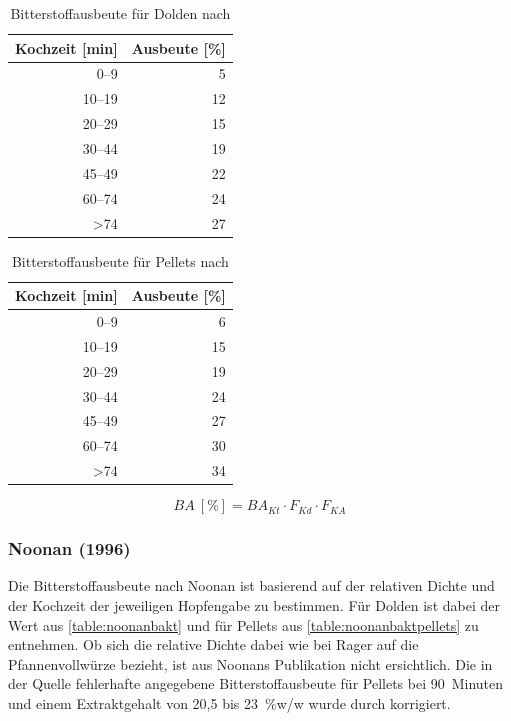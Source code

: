 \documentclass[a4paper,parskip=half]{scrartcl}
\newcommand{\BA}{\mathit{BA}}
\newcommand{\BAKt}{{\mathit{BA}}_{\mathit{Kt}}}
\newcommand{\uper}{\:[\text{\%}]}
\newcommand{\FKd}{F_{\mathit{Kd}}}
\newcommand{\FHR}{F_{\mathit{KA}}}
\begin{document}
\begin{table}[H]
\centering
\begin{tabular}{rr}
\toprule
\multicolumn{1}{c}{\textbf{Kochzeit [min]}} & \multicolumn{1}{c}{\textbf{Ausbeute [\%]}} \\
\midrule
0–9            & 5  \\
10–19          & 12 \\
20–29          & 15 \\
30–44          & 19 \\
45–49          & 22 \\
60–74          & 24 \\
>74            & 27 \\
\bottomrule
\end{tabular}
\caption{Bitterstoffausbeute für Dolden nach \citeauthor{Daniels1996} \parencite[80]{Daniels1996}}
\label{table:danielsbakt}
\end{table}

\begin{table}[H]
\centering
\begin{tabular}{rr}
\toprule
\multicolumn{1}{c}{\textbf{Kochzeit [min]}} & \multicolumn{1}{c}{\textbf{Ausbeute [\%]}} \\
\midrule
0–9            & 6 \\
10–19          & 15 \\
20–29          & 19 \\
30–44          & 24 \\
45–49          & 27 \\
60–74          & 30 \\
>74            & 34 \\
\bottomrule
\end{tabular}
\caption{Bitterstoffausbeute für Pellets nach \citeauthor{Daniels1996} \parencite[80]{Daniels1996}}
\label{table:danielsbaktpellets}
\end{table}

\begin{equation}
\BA \uper = \BAKt \cdot \FKd \cdot \FHR
\label{eq:danielsba}
\end{equation}


\subsubsection*{Noonan (1996)}

Die Bitterstoffausbeute nach Noonan ist basierend auf der relativen Dichte und der Kochzeit der jeweiligen Hopfengabe zu bestimmen. Für Dolden ist dabei der Wert aus \autoref{table:noonanbakt} und für Pellets aus \autoref{table:noonanbaktpellets} zu entnehmen. Ob sich die relative Dichte dabei wie bei Rager auf die Pfannenvollwürze bezieht, ist aus Noonans Publikation nicht ersichtlich. Die in der Quelle fehlerhafte angegebene Bitterstoffausbeute für Pellets bei 90~Minuten und einem Extraktgehalt von 20,5 bis 23~\%w/w wurde durch korrigiert.
\end{document}
